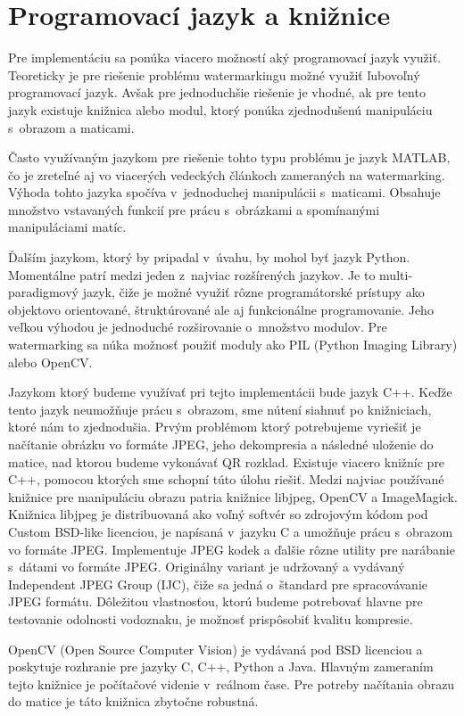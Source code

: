 \section{Programovací jazyk a knižnice} \label{kniznice}
Pre implementáciu sa ponúka viacero možností aký programovací jazyk využiť. Teoreticky je pre riešenie problému watermarkingu možné využiť ľubovoľný programovací jazyk. Avšak pre jednoduchšie riešenie je vhodné, ak pre tento jazyk existuje knižnica alebo modul, ktorý ponúka zjednodušenú manipuláciu s~obrazom a maticami.

Často využívaným jazykom pre riešenie tohto typu problému je jazyk MATLAB, čo je zreteľné aj vo viacerých vedeckých článkoch zameraných na watermarking. Výhoda tohto jazyka spočíva v~jednoduchej manipulácii s~maticami. Obsahuje množstvo vstavaných funkcií pre prácu s~obrázkami a spomínanými manipuláciami matíc.

Ďalším jazykom, ktorý by pripadal v~úvahu, by mohol byť jazyk Python. Momentálne patrí medzi jeden z~najviac rozšírených jazykov. Je to multi-paradigmový jazyk, čiže je možné využiť rôzne programátorské prístupy ako objektovo orientované, štruktúrované ale aj funkcionálne programovanie. Jeho veľkou výhodou je jednoduché rozširovanie o~množstvo modulov. Pre watermarking sa núka možnosť použiť moduly ako PIL (Python Imaging Library) alebo OpenCV.

Jazykom ktorý budeme využívať pri tejto implementácii bude jazyk C++. Keďže tento jazyk neumožňuje prácu s~obrazom, sme nútení siahnuť po knižniciach, ktoré nám to zjednodušia. Prvým problémom ktorý potrebujeme vyriešiť je načítanie obrázku vo formáte JPEG, jeho dekompresia a následné uloženie do matice, nad ktorou budeme vykonávať QR rozklad. Existuje viacero knižníc pre C++, pomocou ktorých sme schopní túto úlohu riešiť. Medzi najviac používané knižnice pre manipuláciu obrazu patria knižnice libjpeg, OpenCV a ImageMagick.
Knižnica libjpeg je distribuovaná ako voľný softvér so zdrojovým kódom pod Custom BSD-like licenciou, je napísaná v~jazyku C a umožňuje prácu s~obrazom vo formáte JPEG. Implementuje JPEG kodek a ďalšie rôzne utility pre narábanie s~dátami vo formáte JPEG. Originálny variant je udržovaný a vydávaný Independent JPEG Group (IJC), čiže sa jedná o~štandard pre spracovávanie JPEG formátu. Dôležitou vlastnosťou, ktorú budeme potrebovať hlavne pre testovanie odolnosti vodoznaku, je možnosť prispôsobiť kvalitu kompresie.

OpenCV (Open Source Computer Vision) je vydávaná pod BSD licenciou a poskytuje rozhranie pre jazyky C, C++, Python a Java. Hlavným zameraním tejto knižnice je počítačové videnie v~reálnom čase. Pre potreby načítania obrazu do matice je táto knižnica zbytočne robustná.


